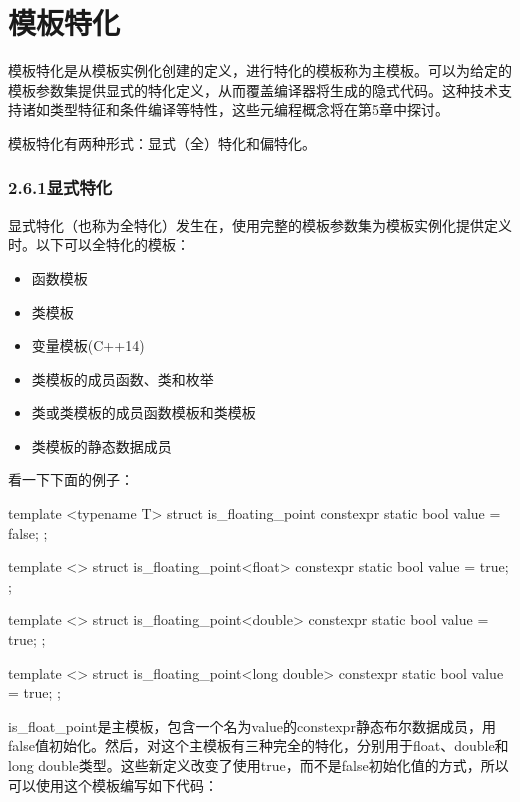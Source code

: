\section{模板特化}

模板特化是从模板实例化创建的定义，进行特化的模板称为主模板。可以为给定的模板参数集提供显式的特化定义，从而覆盖编译器将生成的隐式代码。这种技术支持诸如类型特征和条件编译等特性，这些元编程概念将在第5章中探讨。

模板特化有两种形式：显式（全）特化和偏特化。

\subsubsection{2.6.1\hspace{0.2cm}显式特化}

显式特化（也称为全特化）发生在，使用完整的模板参数集为模板实例化提供定义时。以下可以全特化的模板：

\begin{itemize}
\item 
函数模板

\item 
类模板

\item 
变量模板(C++14)

\item 
类模板的成员函数、类和枚举

\item 
类或类模板的成员函数模板和类模板

\item 
类模板的静态数据成员
\end{itemize}

看一下下面的例子：

\begin{cpp}
template <typename T>
struct is_floating_point
{
	constexpr static bool value = false;
};

template <>
struct is_floating_point<float>
{
	constexpr static bool value = true;
};

template <>
struct is_floating_point<double>
{
	constexpr static bool value = true;
};

template <>
struct is_floating_point<long double>
{
	constexpr static bool value = true;
};
\end{cpp}

is\_float\_point是主模板，包含一个名为value的constexpr静态布尔数据成员，用false值初始化。然后，对这个主模板有三种完全的特化，分别用于float、double和long double类型。这些新定义改变了使用true，而不是false初始化值的方式，所以可以使用这个模板编写如下代码：

